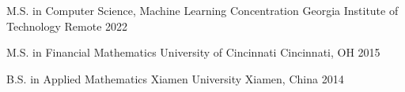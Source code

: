 


\begin{cvhonors}


\cvhonor
{M.S. in Computer Science, Machine Learning Concentration} %
{Georgia Institute of Technology } %
{Remote} %
{2022} %
    

\cvhonor
{M.S. in Financial Mathematics} %
{University of Cincinnati} %
{Cincinnati, OH} %
{2015} %

\cvhonor
{B.S. in Applied Mathematics} %
{Xiamen University} %
{Xiamen, China} %
{2014}

\end{cvhonors}